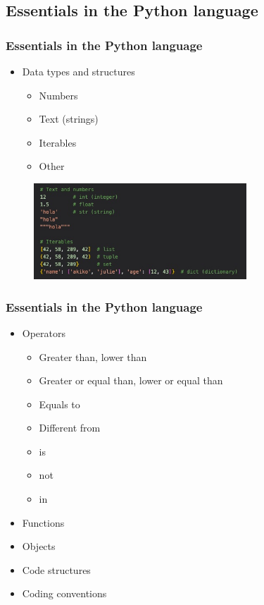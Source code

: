 \subsection{Essentials in the Python language}

\begin{frame}\frametitle{Essentials in the Python language}

   \begin{itemize}
      \item Data types and structures
      \begin{itemize}
         \item Numbers
         \item Text (strings)
         \item Iterables
         \item Other
      \end{itemize}
   \end{itemize}

   \begin{figure}[H]
      \includegraphics[width=8cm]{../images/illustrations/python_types.jpg}
   \end{figure}

\end{frame}


\begin{frame}\frametitle{Essentials in the Python language}

   \begin{itemize}
      \item Operators
      \begin{itemize}
         \item Greater than, lower than
         \item Greater or equal than, lower or equal than
         \item Equals to
         \item Different from
         \item is
         \item not
         \item in
      \end{itemize}

      \item Functions

      \item Objects

      \item Code structures
      \item Coding conventions
   \end{itemize}

\end{frame}

